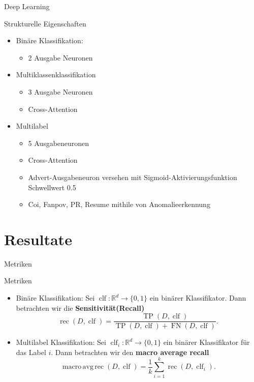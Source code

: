 \documentclass[aspectratio=169]{beamer} %
\newcommand{\clf}{\operatorname{clf}}
\newcommand{\rec}{\operatorname{rec}}
\newcommand{\tp}{\operatorname{TP}}
\newcommand{\fn}{\operatorname{FN}}
\begin{document}
\begin{frame}{Deep Learning}
    \begin{block}{Strukturelle Eigenschaften}
       \begin{itemize}
       

        \item Binäre Klassifikation:
        \begin{itemize}
        \item 2 Ausgabe Neuronen
        \end{itemize}
        \item Multiklassenklassifikation
        \begin{itemize}
        \item 3 Ausgabe Neuronen
        \item Cross-Attention
        \end{itemize}
        \item Multilabel
        \begin{itemize}
        \item 5 Ausgabeneuronen
        \item Cross-Attention
        \item Advert-Ausgabeneuron versehen mit Sigmoid-Aktivierungsfunktion Schwellwert 0.5
        \item Coi, Fanpov, PR, Resume mithile von Anomalieerkennung
               \end{itemize}
        \end{itemize}
        
    \end{block}
\end{frame}



\section{Resultate}

\begin{frame}{Metriken}
    \begin{block}{Metriken}
        \begin{itemize}
            \item Binäre Klassifikation: Sei $\clf\colon \mathbb{R}^d\to \{0, 1\}$ ein binärer Klassifikator. Dann betrachten wir die  \textbf{Sensitivität(Recall)}
                  \begin{equation*}
                      \rec(D, \clf) = \frac{\tp(D, \clf)}{\tp(D, \clf) + \fn(D, \clf)}.
                  \end{equation*}

            \item Multilabel Klassifikation: Sei $\clf_i\colon\mathbb{R}^d\to\{0, 1\}$ ein binärer Klassifikator für das Label $i$. Dann betrachten wir den \textbf{macro average recall}
                  \begin{equation*}
                      \operatorname{macro\,avg\,rec}(D, \clf) = \frac{1}{k}\sum_{i=1}^k\rec (D, \clf_i).
                  \end{equation*}
        \end{itemize}
    \end{block}
\end{frame}
\end{document}
